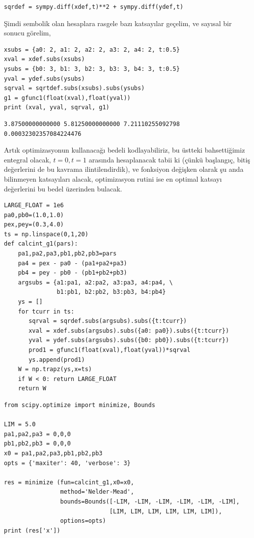 \documentclass[12pt,fleqn]{article}\usepackage{../../common}
\begin{document}
\begin{verbatim}
sqrdef = sympy.diff(xdef,t)**2 + sympy.diff(ydef,t)
\end{verbatim}

Şimdi sembolik olan hesaplara rasgele bazı katsayılar geçelim, ve sayısal bir
sonucu görelim,

\begin{verbatim}
xsubs = {a0: 2, a1: 2, a2: 2, a3: 2, a4: 2, t:0.5}
xval = xdef.subs(xsubs)
ysubs = {b0: 3, b1: 3, b2: 3, b3: 3, b4: 3, t:0.5}
yval = ydef.subs(ysubs)
sqrval = sqrtdef.subs(xsubs).subs(ysubs)
g1 = gfunc1(float(xval),float(yval))
print (xval, yval, sqrval, g1)
\end{verbatim}

\begin{verbatim}
3.87500000000000 5.81250000000000 7.21110255092798 0.00032302357084224476
\end{verbatim}

Artık optimizasyonun kullanacağı bedeli kodlayabiliriz, bu üstteki bahsettiğimiz
entegral olacak, $t=0,t=1$ arasında hesaplanacak tabii ki (çünkü başlangıç,
bitiş değerlerini de bu kavrama ilintilendirdik), ve fonksiyon değişken olarak
şu anda bilinmeyen katsayıları alacak, optimizasyon rutini ise en optimal
katsayı değerlerini bu bedel üzerinden bulacak.

\begin{verbatim}
LARGE_FLOAT = 1e6
pa0,pb0=(1.0,1.0)
pex,pey=(0.3,4.0)
ts = np.linspace(0,1,20)
def calcint_g1(pars):
    pa1,pa2,pa3,pb1,pb2,pb3=pars
    pa4 = pex - pa0 - (pa1+pa2+pa3)
    pb4 = pey - pb0 - (pb1+pb2+pb3)
    argsubs = {a1:pa1, a2:pa2, a3:pa3, a4:pa4, \
               b1:pb1, b2:pb2, b3:pb3, b4:pb4}
    ys = []
    for tcurr in ts:
       sqrval = sqrdef.subs(argsubs).subs({t:tcurr})
       xval = xdef.subs(argsubs).subs({a0: pa0}).subs({t:tcurr})
       yval = ydef.subs(argsubs).subs({b0: pb0}).subs({t:tcurr})
       prod1 = gfunc1(float(xval),float(yval))*sqrval
       ys.append(prod1)
    W = np.trapz(ys,x=ts)
    if W < 0: return LARGE_FLOAT
    return W
\end{verbatim}


\begin{verbatim}
from scipy.optimize import minimize, Bounds

LIM = 5.0
pa1,pa2,pa3 = 0,0,0
pb1,pb2,pb3 = 0,0,0
x0 = pa1,pa2,pa3,pb1,pb2,pb3
opts = {'maxiter': 40, 'verbose': 3}

res = minimize (fun=calcint_g1,x0=x0,
                method='Nelder-Mead',
                bounds=Bounds([-LIM, -LIM, -LIM, -LIM, -LIM, -LIM],
                              [LIM, LIM, LIM, LIM, LIM, LIM]),
                options=opts)
print (res['x'])
\end{verbatim}
\end{document}
